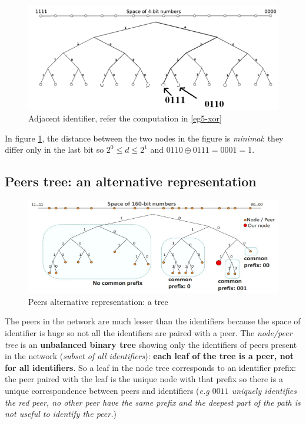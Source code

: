 \documentclass[10pt,a4paper]{report}
\begin{document}
\begin{figure}[h]
	\includegraphics[scale=0.60]{images/Pasted image 20230304105143.png}
	\caption{Adjacent identifier, refer the computation in \ref{eg5-xor}}
	\label{eg5-space-id}
\end{figure}

In figure \ref{eg5-space-id}, the distance between the two nodes in the figure is \textit{minimal}: they differ only in the last bit so $2^{0} \leq d \le 2^{1}$  and $0110 \oplus 0111 = 0001 = 1$.
\clearpage
\subsection{Peers tree: an alternative representation}\label{sec:peers-tree-an-alternative-representation}
\begin{figure}[h]
	\centering
	\includegraphics[scale=0.60]{images/Pasted image 20230304105337.png}
	\caption{Peers alternative representation: a tree}
	\label{peer-tree-represent}
\end{figure}

The peers in the network are much lesser than the identifiers because the space of identifier is huge so not all the identifiers are paired with a peer.
The \textit{node/peer tree} is an \textbf{unbalanced binary tree} showing only the identifiers of peers present in the network (\textit{subset of all identifiers}): \textbf{each leaf of the tree is a peer, not for all identifiers}. So a leaf in the node tree corresponds to an identifier prefix: the peer paired with the leaf is the unique node with that prefix so there is a unique correspondence between peers and identifiers (\textit{e.g $0011$ uniquely identifies the red peer, no other peer have the same prefix and the deepest part of the path is not useful to identify the peer.})
\end{document}
